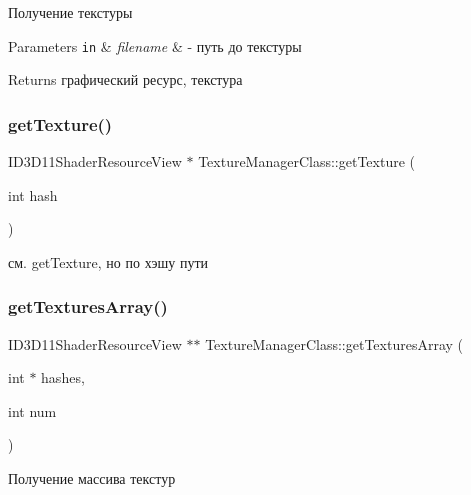 Получение текстуры 


\begin{DoxyParams}[1]{Parameters}
\mbox{\tt in}  & {\em filename} & -\/ путь до текстуры \\
\hline
\end{DoxyParams}
\begin{DoxyReturn}{Returns}
графический ресурс, текстура 
\end{DoxyReturn}
\mbox{\label{class_texture_manager_class_a6f9486a1e45246aef031533b2d4ea456}} 
\subsubsection{\texorpdfstring{get\+Texture()}{getTexture()}\hspace{0.1cm}{\footnotesize\ttfamily [2/2]}}
{\footnotesize\ttfamily I\+D3\+D11\+Shader\+Resource\+View $\ast$ Texture\+Manager\+Class\+::get\+Texture (\begin{DoxyParamCaption}\item[{int}]{hash }\end{DoxyParamCaption})}



см. get\+Texture, но по хэшу пути 

\mbox{\label{class_texture_manager_class_ab0d1f5332078c19ccb63bcd9360706d3}} 
\subsubsection{\texorpdfstring{get\+Textures\+Array()}{getTexturesArray()}}
{\footnotesize\ttfamily I\+D3\+D11\+Shader\+Resource\+View $\ast$$\ast$ Texture\+Manager\+Class\+::get\+Textures\+Array (\begin{DoxyParamCaption}\item[{int $\ast$}]{hashes,  }\item[{int}]{num }\end{DoxyParamCaption})}



Получение массива текстур 


